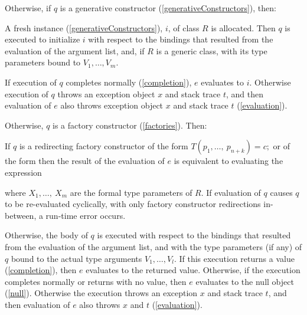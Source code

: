 \documentclass{article}
\begin{document}
\LMHash{}
Otherwise, if $q$ is a generative constructor (\ref{generativeConstructors}), then:


\LMHash{}
A fresh instance (\ref{generativeConstructors}), $i$, of class $R$ is allocated.
Then $q$ is executed to initialize $i$ with respect to the bindings that resulted from the evaluation of the argument list, and, if $R$ is a generic class, with its type parameters bound to $V_1, \ldots, V_m$.

If execution of $q$ completes normally (\ref{completion}), $e$ evaluates to $i$.
Otherwise execution of $q$ throws an exception object $x$ and stack trace $t$,
and then evaluation of $e$ also throws exception object $x$ and stack trace $t$
(\ref{evaluation}).

\LMHash{}
Otherwise, $q$ is a factory constructor (\ref{factories}).
Then:

\LMHash{}
If $q$ is a redirecting factory constructor of the form $T(p_1, \ldots,\ p_{n+k}) = c;$ or of the form  then the result of the evaluation of $e$ is equivalent to evaluating the expression


\noindent
where $X_1, \ldots,\ X_m$ are the formal type parameters of $R$.
If evaluation of $q$ causes $q$ to be re-evaluated cyclically, with only factory constructor redirections in-between, a run-time error occurs.

\LMHash{}
Otherwise, the body of $q$ is executed with respect to the bindings that resulted from the evaluation of the argument list, and with the type parameters (if any) of $q$ bound to the actual type arguments $V_1, \ldots, V_l$.
If this execution returns a value (\ref{completion}),
then $e$ evaluates to the returned value.
Otherwise, if the execution completes normally or returns with no value,
then $e$ evaluates to the null object (\ref{null}).
Otherwise the execution throws an exception $x$ and stack trace $t$,
and then evaluation of $e$ also throws $x$ and $t$ (\ref{evaluation}).
\end{document}

